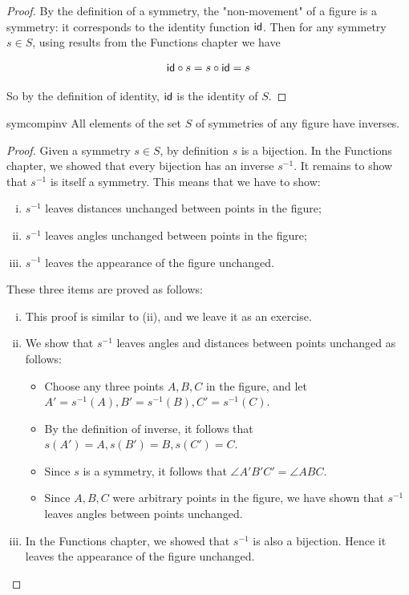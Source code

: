 \begin{proof}
By the definition of a symmetry, the "non-movement" of a figure is a symmetry: it corresponds to the identity function ${\sf{i}d}$.  Then for any symmetry $s \in S$, using results from the Functions chapter we have


$${\sf{i}d} \circ s = s \circ {\sf{i}d} = s$$

So by the definition of identity, ${\sf{i}d}$ is the identity of $S$.  
\end{proof}


\begin{prop}{symcompinv}
All elements of the set $S$ of symmetries of any figure have inverses.
\end{prop}

\begin{proof}
Given a symmetry $s \in S$, by definition $s$ is a bijection.  In the Functions chapter, we showed that every bijection has an inverse $s^{-1}$. It remains to show that $s^{-1}$ is itself a symmetry. This means that we have to show: 

\begin{enumerate}[(i)]
\item
 $s^{-1}$ leaves distances unchanged between points in the figure;  
\item
$s^{-1}$ leaves angles unchanged between points in the figure; 
\item
$s^{-1}$ leaves the appearance of the figure unchanged.  
\end{enumerate}

\noindent  These three items are proved as follows:

\begin{enumerate}[(i)]
\item
This proof is similar to (ii), and we leave it as an exercise.
\item
We show that $s^{-1}$ leaves angles and distances between points unchanged as follows:
\begin{itemize}
\item
 Choose any three points $A, B, C$ in the figure, and let $A'=s^{-1}(A), B'=s^{-1}(B),  C'=s^{-1}(C)$. 
\item
By the definition of inverse, it follows that 
$s(A')=A, s(B')=B, s(C')=C$. 
\item
Since $s$ is a symmetry, it follows that $\angle A'B'C' =\angle ABC$.  
\item
Since $A,B, C$ were arbitrary points in the figure, we have shown 
that $s^{-1}$ leaves angles between points unchanged.
\end{itemize}
\item In the Functions chapter, we showed that $s^{-1}$ is also a bijection. Hence it leaves the appearance of the figure unchanged.
\end{enumerate} 
\end{proof}

